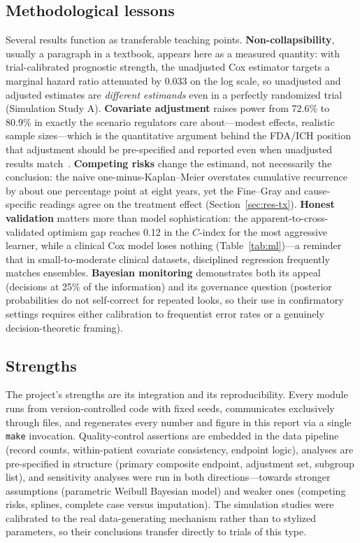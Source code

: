 \subsection{Methodological lessons}

Several results function as transferable teaching points.
\textbf{Non-collapsibility}, usually a paragraph in a textbook,
appears here as a measured quantity: with trial-calibrated prognostic
strength, the unadjusted Cox estimator targets a marginal hazard ratio
attenuated by $0.033$ on the log scale, so unadjusted and adjusted
estimates are \emph{different estimands} even in a perfectly
randomized trial (Simulation Study A). \textbf{Covariate adjustment}
raises power from 72.6\% to 80.9\% in exactly the scenario regulators
care about---modest effects, realistic sample sizes---which is the
quantitative argument behind the FDA/ICH position that adjustment
should be pre-specified and reported even when unadjusted results
match~\cite{fda2023,kahan2014}. \textbf{Competing risks} change the
estimand, not necessarily the conclusion: the naive
one-minus-Kaplan--Meier overstates cumulative recurrence by about one
percentage point at eight years, yet the Fine--Gray and cause-specific
readings agree on the treatment effect
(Section~\ref{sec:res-tx}). \textbf{Honest validation} matters more
than model sophistication: the apparent-to-cross-validated optimism
gap reaches 0.12 in the $C$-index for the most aggressive learner,
while a clinical Cox model loses nothing
(Table~\ref{tab:ml})---a reminder that in small-to-moderate clinical
datasets, disciplined regression frequently matches ensembles.
\textbf{Bayesian monitoring} demonstrates both its appeal (decisions
at 25\% of the information) and its governance question (posterior
probabilities do not self-correct for repeated looks, so their use in
confirmatory settings requires either calibration to frequentist
error rates or a genuinely decision-theoretic framing).

\subsection{Strengths}

The project's strengths are its integration and its reproducibility.
Every module runs from version-controlled code with fixed seeds,
communicates exclusively through files, and regenerates every number
and figure in this report via a single \texttt{make} invocation.
Quality-control assertions are embedded in the data pipeline (record
counts, within-patient covariate consistency, endpoint logic),
analyses are pre-specified in structure (primary composite endpoint,
adjustment set, subgroup list), and sensitivity analyses were run in
both directions---towards stronger assumptions (parametric Weibull
Bayesian model) and weaker ones (competing risks, splines, complete
case versus imputation). The simulation studies were calibrated to the
real data-generating mechanism rather than to stylized parameters, so
their conclusions transfer directly to trials of this type.

